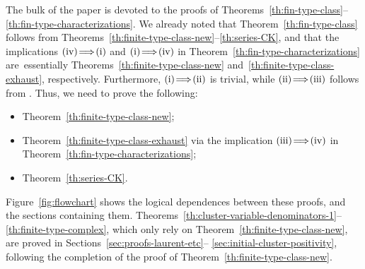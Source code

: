 \documentclass[letterpaper]{amsart}
\numberwithin{equation}{section}
\theoremstyle{definition}
\begin{document}
The bulk of the paper is devoted to the proofs of 
Theorems~\ref{th:fin-type-class}--\ref{th:fin-type-characterizations}. 
We already noted that Theorem~\ref{th:fin-type-class} 
follows from 
Theorems~\ref{th:finite-type-class-new}--\ref{th:series-CK}, 
and that the implications ${\rm(iv)}\!\Longrightarrow\!{\rm(i)}$ 
and ${\rm(i)}\!\Longrightarrow\!{\rm(iv)}$ 
in Theorem~\ref{th:fin-type-characterizations} are~essentially 
Theorems~\ref{th:finite-type-class-new} 
and~\ref{th:finite-type-class-exhaust}, respectively. 
Furthermore, 
${\rm(i)}\!\Longrightarrow\!{\rm(ii)}$ is trivial, 
while ${\rm(ii)}\!\Longrightarrow\!{\rm(iii)}$ follows from 
\cite[Theorem~6.1]{fz-clust1}. 
Thus, we need to prove the following: 
\begin{itemize} 
\item 
Theorem~\ref{th:finite-type-class-new}; 
\item 
Theorem~\ref{th:finite-type-class-exhaust} via the implication 
${\rm(iii)}\!\Longrightarrow\!{\rm(iv)}$ 
in Theorem~\ref{th:fin-type-characterizations}; 
\item 
Theorem~\ref{th:series-CK}. 
\end{itemize} 
Figure~\ref{fig:flowchart} shows the logical dependences between these 
proofs, and the sections containing them. 
Theorems~\ref{th:cluster-variable-denominators-1}--\ref{th:finite-type-complex}, 
which only rely on Theorem~\ref{th:finite-type-class-new}, 
are proved in Sections~\ref{sec:proofs-laurent-etc}-- 
\ref{sec:initial-cluster-positivity}, 
following the completion of the proof of 
Theorem~\ref{th:finite-type-class-new}. 
 
 
 
 
\end{document}
